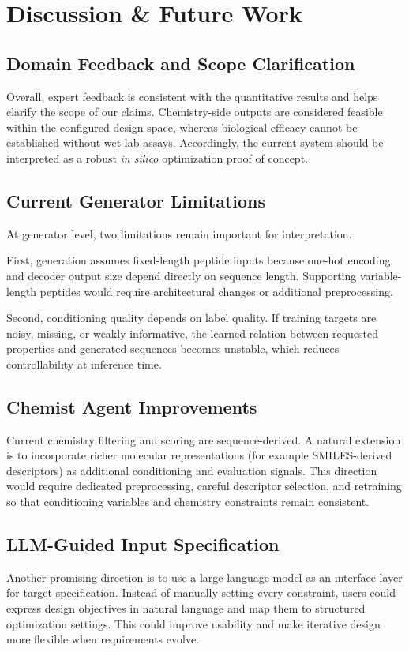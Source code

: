 \section{Discussion \& Future Work}\label{sec:discussion}

\subsection{Domain Feedback and Scope Clarification}
Overall, expert feedback is consistent with the quantitative results and helps clarify the scope of our claims. Chemistry-side outputs are considered feasible within the configured design space, whereas biological efficacy cannot be established without wet-lab assays. Accordingly, the current system should be interpreted as a robust \textit{in silico} optimization proof of concept.

\subsection{Current Generator Limitations}
At generator level, two limitations remain important for interpretation.

First, generation assumes fixed-length peptide inputs because one-hot encoding and decoder output size depend directly on sequence length. Supporting variable-length peptides would require architectural changes or additional preprocessing.

Second, conditioning quality depends on label quality. If training targets are noisy, missing, or weakly informative, the learned relation between requested properties and generated sequences becomes unstable, which reduces controllability at inference time.

\subsection{Chemist Agent Improvements}
Current chemistry filtering and scoring are sequence-derived. A natural extension is to incorporate richer molecular representations (for example SMILES-derived descriptors) as additional conditioning and evaluation signals. This direction would require dedicated preprocessing, careful descriptor selection, and retraining so that conditioning variables and chemistry constraints remain consistent.

\subsection{LLM-Guided Input Specification}
Another promising direction is to use a large language model as an interface layer for target specification. Instead of manually setting every constraint, users could express design objectives in natural language and map them to structured optimization settings. This could improve usability and make iterative design more flexible when requirements evolve.

